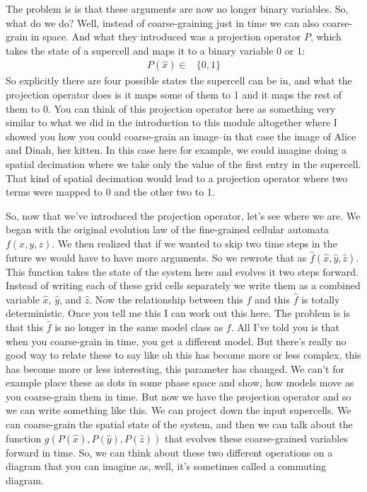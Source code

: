 \documentclass[]{article}
\begin{document}
The problem is is that these arguments are now no longer binary variables.
So, what do we do? Well, instead of coarse-graining just in time we can also
coarse-grain in space.
And what they introduced was a projection operator $P$, which takes the state of a supercell and maps it to a binary variable 0 or 1:
\begin{align*}
	P(\hat{x}) \in& \{0,1\}
\end{align*}
So explicitly there are four possible states the supercell can be in, and what the projection operator does is it maps some of them to 1 and it maps the rest of them to 0.
You can think of this projection operator here as something very similar to what we did in the introduction to this module altogether where I showed you how you could coarse-grain an image--in that case the image of Alice and Dinah, her kitten.
In this case here for example, we could imagine doing a spatial decimation where we take only the value of the first entry in the supercell.
That kind of spatial decimation would lead to a projection operator where two terms were mapped to 0 and the other two to 1.

So, now that we've introduced the projection operator, let's see where we are.
We began with the original evolution law of the fine-grained cellular automata $f(x, y, z)$.
We then realized that if we wanted to skip two time steps in the future we would have to have more arguments.
So we rewrote that as $\hat{f}(\hat{x},\hat{y},\hat{z})$.
This function takes the state of the system here and evolves it two steps forward.
Instead of writing each of these grid cells separately we write them as a combined variable $\hat{x}$, $\hat{y}$, and $\hat{z}$.
Now the relationship between this $f$ and this $\hat{f}$  is totally deterministic.
Once you tell me this I can work out this here.
The problem is is that this $\hat{f}$ is no longer in the same model class as $f$.
All I've told you is that when you coarse-grain in time, you get a different model.
But there's really no good way to relate these to say like oh this has become more or less complex, this has become more or less interesting,
this parameter has changed. We can't for example place these as dots in some phase space and show, how models move as you coarse-grain them in time.
But now we have the projection operator and so we can write something like this.
We can project down the input supercells.
We can coarse-grain the spatial state of the system, and then we can talk about
the function $g(P(\hat{x}), P(\hat{y}), P(\hat{z}))$ that evolves these coarse-grained variables forward in time.
So, we can think about these two different operations on a diagram that you can imagine as, well, it's sometimes called a commuting diagram.
\end{document}

